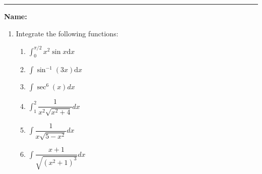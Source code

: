 \documentclass[11pt]{article}
\begin{document}
    \hrule
    \vspace{.5cm}
    \noindent\textbf{Name:} \underline{\qquad\qquad\qquad\qquad\qquad\qquad\qquad\qquad\qquad\qquad\qquad\qquad\qquad}

    \begin{enumerate}
        \item Integrate the following functions:
        \begin{enumerate}
            \item $\displaystyle \int_0^{\pi/2} x^2 \sin x \mathrm{d} x$\vfill
            \item $\displaystyle \int \sin^{-1}(3x) \mathrm{d} x$\vfill
            \newpage
            \item $\displaystyle\int\sec^{6}(x)dx$\vfill
            \item $\displaystyle\int_{1}^{2}\dfrac{1}{x^{2}\sqrt{x^{2}+4}}dx$\vfill
            \newpage
            \item $\displaystyle\int\dfrac{1}{x\sqrt{5-x^{2}}}dx$\vfill
            \item $\displaystyle\int\dfrac{x+1}{\sqrt{(x^{2}+1)^{3}}}dx$\vfill
        \end{enumerate}
    \end{enumerate}
\end{document}
